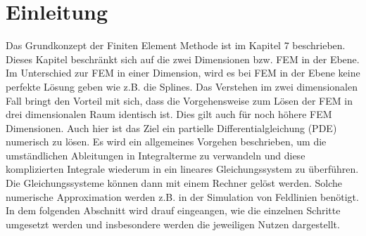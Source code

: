 %
%
%
\section{Einleitung\label{fem:section:einleitung}}
Das Grundkonzept der Finiten Element Methode ist im Kapitel 7 beschrieben. Dieses  Kapitel beschränkt sich auf die zwei Dimensionen bzw. FEM in der Ebene. Im Unterschied zur FEM in einer Dimension, wird es bei FEM in der Ebene keine perfekte Lösung geben wie z.B. die Splines. Das Verstehen im zwei dimensionalen Fall bringt den Vorteil mit sich, dass die Vorgehensweise zum Lösen der FEM in drei dimensionalen Raum identisch ist. Dies gilt auch für noch höhere FEM Dimensionen. Auch hier ist das Ziel ein partielle Differentialgleichung (PDE) numerisch zu lösen. Es wird ein allgemeines Vorgehen beschrieben, um die umständlichen Ableitungen in Integralterme zu verwandeln und diese komplizierten Integrale wiederum in ein lineares Gleichungssystem zu überführen. Die Gleichungssysteme können dann mit einem Rechner gelöst  werden. Solche numerische Approximation werden z.B. in der Simulation von Feldlinien benötigt. 
In dem folgenden Abschnitt wird drauf eingeangen, wie die einzelnen Schritte umgesetzt werden und insbesondere werden die jeweiligen Nutzen dargestellt.

